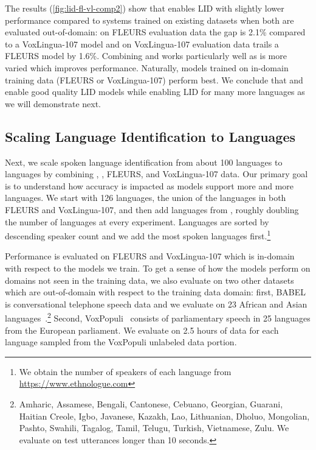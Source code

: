 The results (\autoref{fig:lid-fl-vl-comp2}) show that \MMSUboth{} enables LID with slightly lower performance compared to systems trained on existing datasets when both are evaluated out-of-domain: 
on FLEURS evaluation data the gap is 2.1\% compared to a VoxLingua-107 model and on VoxLingua-107 evaluation data \MMSUboth{} trails a FLEURS model by 1.6\%.
Combining \MMSU{} and \GRN{} works particularly well as \GRN{} is more varied which improves performance.
Naturally, models trained on in-domain training data (FLEURS or VoxLingua-107) perform best.
We conclude that \MMSU{} and \GRN{} enable good quality LID models while enabling LID for many more languages as we will demonstrate next.



\subsection{Scaling Language Identification to \numlidlang{} Languages}
\label{sec:lid-scaling}

\insertLIDResultsScaling

Next, we scale spoken language identification from about 100 languages to \numlidlang{} languages by combining \MMSU{}, \GRN{}, FLEURS, and VoxLingua-107 data.
Our primary goal is to understand how accuracy is impacted as models support more and more languages.
We start with 126 languages, the union of the languages in both FLEURS and VoxLingua-107, and then add languages from \MMSUboth{}, roughly doubling the number of languages at every experiment.
Languages are sorted by descending speaker count and we add the most spoken languages first.\footnote{We obtain the number of speakers of each language from \url{https://www.ethnologue.com}}

Performance is evaluated on FLEURS and VoxLingua-107 which is in-domain with respect to the models we train.
To get a sense of how the models perform on domains not seen in the training data, we also evaluate on two other datasets which are out-of-domain with respect to the training data domain:
first, BABEL is conversational telephone speech data and we evaluate on 23 African and Asian languages~\citep{gales2014babel}.\footnote{Amharic, Assamese, Bengali, Cantonese, Cebuano, Georgian, Guarani, Haitian Creole, Igbo, Javanese, Kazakh, Lao, Lithuanian, Dholuo, Mongolian, Pashto, Swahili, Tagalog, Tamil, Telugu, Turkish, Vietnamese,  Zulu. 
We evaluate on test utterances longer than 10 seconds.}
Second, VoxPopuli~\citep{wang2021voxpopuli} consists of parliamentary speech in 25 languages from the European parliament. 
We evaluate on 2.5 hours of data for each language sampled from the VoxPopuli unlabeled data portion.

